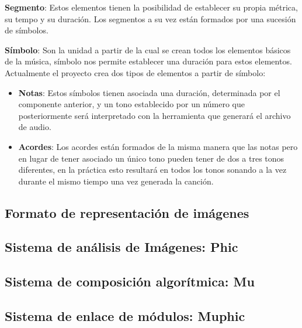 \textbf{Segmento}: Estos elementos tienen la posibilidad de establecer su propia métrica, su tempo y su duración. Los segmentos a su vez están formados por una sucesión de símbolos.
\newline

\textbf{Símbolo}: Son la unidad a partir de la cual se crean todos los elementos básicos de la música, símbolo nos permite establecer una duración para estos elementos. Actualmente el proyecto crea dos tipos de elementos a partir de símbolo:
\begin{itemize}
\item \textbf{Notas}: Estos símbolos tienen asociada una duración, determinada por el componente anterior, y un tono establecido por un número que posteriormente será interpretado con la herramienta que generará el archivo de audio.
\item \textbf{Acordes}: Los acordes están formados de la misma manera que las notas pero en lugar de tener asociado un único tono pueden tener de dos a tres tonos diferentes, en la práctica esto resultará en todos los tonos sonando a la vez durante el mismo tiempo una vez generada la canción.
\end{itemize}

\subsection{Formato de representación de imágenes}


\subsection{Sistema de análisis de Imágenes: Phic}


\subsection{Sistema de composición algorítmica: Mu}


\subsection{Sistema de enlace de módulos: Muphic}


